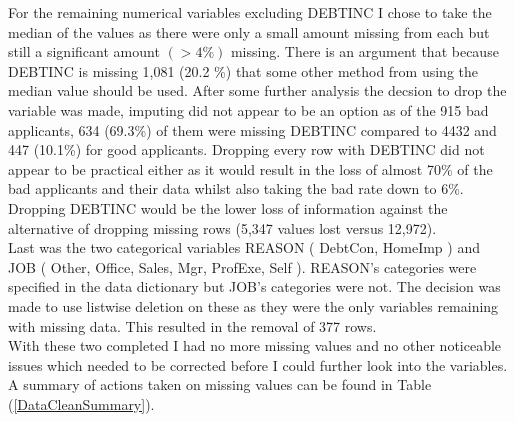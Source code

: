 For the remaining numerical variables excluding DEBTINC I chose to take the median of the values as there were only a small amount missing from each but still a significant amount $( > 4\% )$ missing. There is an argument that because DEBTINC is missing 1,081 (20.2 \%) that some other method from using the median value should be used. After some further analysis the decsion to drop the variable was made, imputing did not appear to be an option as of the 915 bad applicants,  634 (69.3\%) of them were missing DEBTINC compared to 4432 and 447 (10.1\%) for good applicants. Dropping every row with DEBTINC did not appear to be practical either as it would result in the loss of almost 70\% of the bad applicants and their data whilst also taking the bad rate down to 6\%. Dropping DEBTINC would be the lower loss of information against the alternative of dropping missing rows (5,347 values lost versus 12,972). \\

Last was the two categorical variables REASON ( DebtCon,  HomeImp ) and JOB ( Other,  Office,  Sales,  Mgr,  ProfExe,  Self ). REASON's categories were specified in the data dictionary but JOB's categories were not. The decision was made to use listwise deletion on these as they were the only variables remaining with missing data. This resulted in the removal of 377 rows. \\

With these two completed I had no more missing values and no other noticeable issues which needed to be corrected before I could further look into the variables. A summary of actions taken on missing values can be found in Table (\ref{DataCleanSummary}). \\

